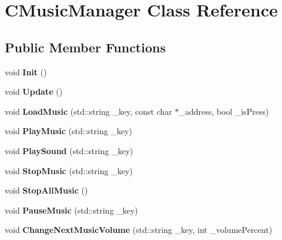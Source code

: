 \hypertarget{class_c_music_manager}{}\section{C\+Music\+Manager Class Reference}
\label{class_c_music_manager}
\subsection*{Public Member Functions}
\begin{DoxyCompactItemize}
\item 
void {\bfseries Init} ()\hypertarget{class_c_music_manager_a2b2ad28c64e99b546738f4eb2fbbf9cb}{}\label{class_c_music_manager_a2b2ad28c64e99b546738f4eb2fbbf9cb}

\item 
void {\bfseries Update} ()\hypertarget{class_c_music_manager_a4bfc67d1679216ffeafdc7b31a6ea722}{}\label{class_c_music_manager_a4bfc67d1679216ffeafdc7b31a6ea722}

\item 
void {\bfseries Load\+Music} (std\+::string \+\_\+key, const char $\ast$\+\_\+address, bool \+\_\+is\+Press)\hypertarget{class_c_music_manager_a804a1da39f6fa3c6d4abed7d7cf6a79c}{}\label{class_c_music_manager_a804a1da39f6fa3c6d4abed7d7cf6a79c}

\item 
void {\bfseries Play\+Music} (std\+::string \+\_\+key)\hypertarget{class_c_music_manager_a17a17733f6a98120fce6807dcb5d541b}{}\label{class_c_music_manager_a17a17733f6a98120fce6807dcb5d541b}

\item 
void {\bfseries Play\+Sound} (std\+::string \+\_\+key)\hypertarget{class_c_music_manager_a92b8463060be1f0e7bf30aa1d7596801}{}\label{class_c_music_manager_a92b8463060be1f0e7bf30aa1d7596801}

\item 
void {\bfseries Stop\+Music} (std\+::string \+\_\+key)\hypertarget{class_c_music_manager_a3071e2d423d5d075d3c8ae7d84b01451}{}\label{class_c_music_manager_a3071e2d423d5d075d3c8ae7d84b01451}

\item 
void {\bfseries Stop\+All\+Music} ()\hypertarget{class_c_music_manager_afadc36f70829f7971c020e4a5e1aa9f4}{}\label{class_c_music_manager_afadc36f70829f7971c020e4a5e1aa9f4}

\item 
void {\bfseries Pause\+Music} (std\+::string \+\_\+key)\hypertarget{class_c_music_manager_ada21101314655986efc1c7ff2c249b96}{}\label{class_c_music_manager_ada21101314655986efc1c7ff2c249b96}

\item 
void {\bfseries Change\+Next\+Music\+Volume} (std\+::string \+\_\+key, int \+\_\+volume\+Percent)\hypertarget{class_c_music_manager_a820aecccbd1662e05b27b0a65d9c19f3}{}\label{class_c_music_manager_a820aecccbd1662e05b27b0a65d9c19f3}

\end{DoxyCompactItemize}
